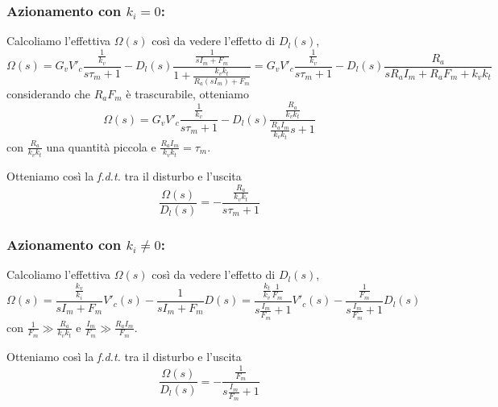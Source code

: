 \subsubsection{Azionamento con $k_i = 0$:}
Calcoliamo l'effettiva $\Omega(s)$ così da vedere l'effetto di $D_l(s)$,
\begin{equation}
	\Omega(s) = G_v V'_c \frac{\frac{1}{k_v}}{s \tau_m + 1} - D_l(s) \frac{\frac{1}{sI_m + F_m}}{1 + \frac{k_v k_t}{R_a (s I_m) + F_m}} = G_v V'_c \frac{\frac{1}{k_v}}{s \tau_m + 1} - D_l(s) \frac{R_a}{s R_a I_m + R_a F_m + k_v k_t}
\end{equation}
considerando che $R_aF_m$ è trascurabile, otteniamo
\begin{equation}
	\Omega(s) = G_v V'_c \frac{\frac{1}{k_v}}{s \tau_m + 1} - D_l(s) \frac{\frac{R_a}{k_vk_t}}{\frac{R_aI_m}{k_vk_t}s + 1}
\end{equation}
con $\frac{R_a}{k_vk_t}$ una quantità piccola e $\frac{R_aI_m}{k_vk_t} = \tau_m$.

Otteniamo così la \emph{f.d.t.} tra il disturbo e l'uscita
\begin{equation}
	\frac{\Omega(s)}{D_l(s)} = - \frac{\frac{R_a}{k_v k_t}}{s\tau_m + 1}
\end{equation}

\subsubsection{Azionamento con $k_i \neq 0$:}
Calcoliamo l'effettiva $\Omega(s)$ così da vedere l'effetto di $D_l(s)$,
\begin{equation}
	\Omega(s) = \frac{\frac{k_v}{k_i}}{sI_m + F_m} V'_c(s) - \frac{1}{sI_m + F_m} D(s) = \frac{\frac{k_t}{k_v} \frac{1}{F_m}}{s \frac{I_m}{F_m}+1} V'_c(s) - \frac{\frac{1}{F_m}}{s\frac{I_m}{F_m} + 1}D_l(s)
\end{equation}
con $\frac{1}{F_m} \gg \frac{R_a}{k_v k_t}$ e $\frac{I_m}{F_m} \gg \frac{R_a I_m}{F_m}$.

Otteniamo così la \emph{f.d.t.} tra il disturbo e l'uscita
\begin{equation}
	\frac{\Omega(s)}{D_l(s)} = - \frac{\frac{1}{F_m}}{s\frac{I_m}{F_m} + 1}
\end{equation}